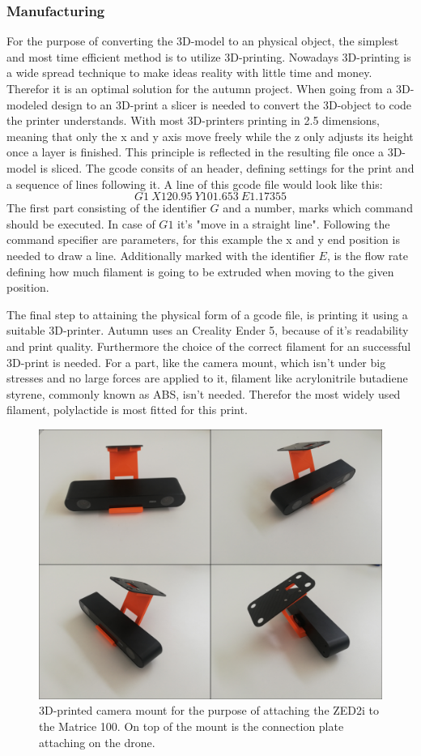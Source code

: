 \subsubsection{Manufacturing}

For the purpose of converting the 3D-model to an physical object, the simplest and most time efficient method is to utilize 3D-printing. Nowadays 3D-printing is a wide spread technique to make ideas reality with little time and money. Therefor it is an optimal solution for the autumn project. 
When going from a 3D-modeled design to an 3D-print a slicer is needed to convert the 3D-object to code the printer understands. With most 3D-printers printing in 2.5 dimensions, meaning that only the x and y axis move freely while the z only adjusts its height once a layer is finished. This principle is reflected in the resulting file once a 3D-model is sliced. The gcode consits of an header, defining settings for the print and a sequence of lines following it. A line of this gcode file would look like this: 
\[G1\ X120.95\ Y101.653\ E1.17355\]
The first part consisting of the identifier $G$ and a number, marks which command should be executed. In case of $G1$ it's "move in a straight line". Following the command specifier are parameters, for this example the x and y end position is needed to draw a line. Additionally marked with the identifier $E$, is the flow rate defining how much filament is going to be extruded when moving to the given position.

The final step to attaining the physical form of a gcode file, is printing it using a suitable 3D-printer. Autumn uses an Creality Ender 5, because of it's readability and print quality. Furthermore the choice of the correct filament for an successful 3D-print is needed. For a part, like the camera mount, which isn't under big stresses and no large forces are applied to it, filament like acrylonitrile butadiene styrene, commonly known as ABS, isn't needed. Therefor the most widely used filament, polylactide is most fitted for this print.

\begin{figure}[h]
	\centering
	\includegraphics[width=0.6\linewidth]{img/MountPrint}
	\caption{3D-printed camera mount for the purpose of attaching the ZED2i to the Matrice 100. On top of the mount is the connection plate attaching on the drone.}
	\label{fig:custom_parts_mountPrint}
\end{figure}

